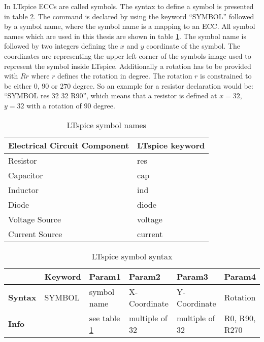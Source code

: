 In LTspice \ac{ECCs} are called symbols.
The syntax to define a symbol is presented in table \ref{tab:ltsymbol_syntax}.
The command is declared by using the keyword ``SYMBOL'' followed by a symbol name, where the symbol name is a mapping to an \ac{ECC}.
All symbol names which are used in this thesis are shown in table \ref{tab:ltsymbol_mapping}.
The symbol name is followed by two integers defining the $x$ and $y$ coordinate of the symbol.
The coordinates are representing the upper left corner of the symbols image used to represent the symbol inside LTspice.
Additionally a rotation has to be provided with $Rr$ where $r$ defines the rotation in degree.
The rotation $r$ is constrained to be either $0$, $90$ or $270$ degree.
So an example for a resistor declaration would be: ``SYMBOL res 32 32 R90'', which means that a resistor is defined at $x = 32$, $y = 32$ with a rotation of $90$ degree.

\begin{table}[H]
\begin{center}

\begin{tabular}{l|l}
    \textbf{Electrical Circuit Component} & \textbf{LTspice keyword}\\
    \hline
    Resistor & res\\
    Capacitor & cap\\
    Inductor & ind\\
    Diode & diode\\
    Voltage Source & voltage\\
    Current Source & current
\end{tabular}
\caption{LTspice symbol names}
\label{tab:ltsymbol_mapping}

\end{center}
\end{table}

\begin{table}[H]
\begin{center}

\begin{tabular}{l|l|l|l|l|l}
    & \textbf{Keyword} & \textbf{Param1} & \textbf{Param2} & \textbf{Param3} & \textbf{Param4}\\
    \hline
    \textbf{Syntax} & SYMBOL & symbol name & X-Coordinate & Y-Coordinate & Rotation\\
    \textbf{Info} & & see table \ref{tab:ltsymbol_mapping} & multiple of 32 & multiple of 32 & R0, R90, R270
\end{tabular}
\caption{LTspice symbol syntax}
\label{tab:ltsymbol_syntax}

\end{center}
\end{table}

